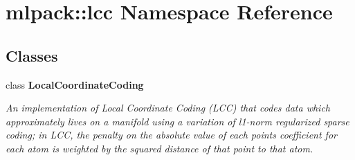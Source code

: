 \section{mlpack\+:\+:lcc Namespace Reference}
\label{namespacemlpack_1_1lcc}
\subsection*{Classes}
\begin{DoxyCompactItemize}
\item 
class {\bf Local\+Coordinate\+Coding}
\begin{DoxyCompactList}\small\item\em An implementation of Local Coordinate Coding (L\+CC) that codes data which approximately lives on a manifold using a variation of l1-\/norm regularized sparse coding; in L\+CC, the penalty on the absolute value of each point\textquotesingle{}s coefficient for each atom is weighted by the squared distance of that point to that atom. \end{DoxyCompactList}\end{DoxyCompactItemize}
